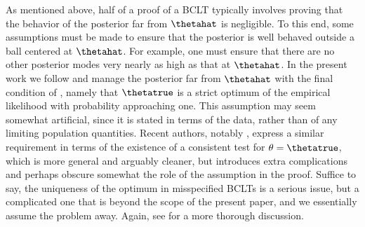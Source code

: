 As mentioned above, half of a proof of a BCLT typically involves proving that
the behavior of the posterior far from $\thetahat$ is negligible.  To this end,
some assumptions must be made to ensure that the posterior is well behaved
outside a ball centered at $\thetahat$.  For example, one must ensure that there
are no other posterior modes very nearly as high as that at $\thetahat$.  In the
present work we follow \citet{ghosh:2003:bayesian, lehman:1983:pointestimation}
and manage the posterior far from $\thetahat$ with the final condition of
, namely that $\thetatrue$ is a strict optimum of the
empirical likelihood with probability approaching one.  This assumption may seem
somewhat artificial, since it is stated in terms of the data, rather than of any
limiting population quantities.  Recent authors, notably
\citet{kleijn:2006:misspecification}, express a similar requirement in terms of
the existence of a consistent test for $\theta = \thetatrue$, which is more
general and arguably cleaner, but introduces extra complications and  perhaps
obscure somewhat the role of the assumption in the proof.  Suffice to say, the
uniqueness of the optimum in misspecified BCLTs is a serious issue, but a
complicated one that is beyond the scope of the present paper, and we
essentially assume the problem away.  Again, see
\citet{kleijn:2006:misspecification} for a more thorough discussion.
